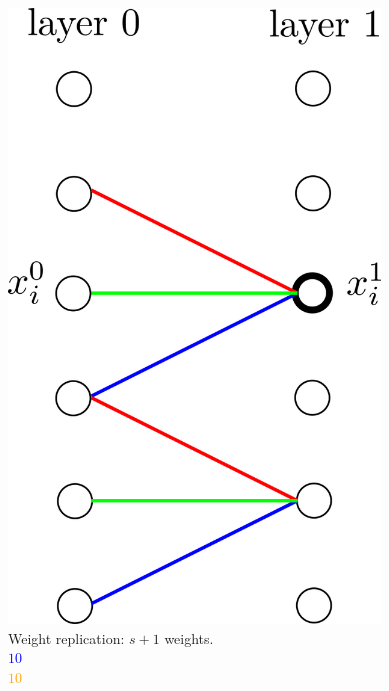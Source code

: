 \documentclass[xcolor=pdftex,dvipsnames,table,mathserif]{beamer}
\begin{document}
{\begin{columns}
    \begin{column}{0.3\textwidth}
      \begin{center}
        \includegraphics[width=0.74\textwidth]{convolutional_layer.png}
        \\ \scriptsize{Weight replication: $s+1$ weights.}
        \\ \textcolor{blue}{\scriptsize{$10$}}
        \\ \textcolor{orange}{\scriptsize{$10$}}

      \end{center}
    \end{column}

  \end{columns}



}
\end{document}
